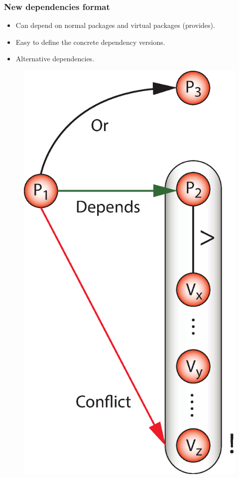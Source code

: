 \documentclass{beamer}
\begin{document}
\begin{frame}
\frametitle{New dependencies format}
\begin{itemize}
  \item Can depend on normal packages and virtual packages (provides).
  \item Easy to define the concrete dependency versions.
  \item Alternative dependencies.
\end{itemize}
\begin{figure}[h!]
  \centering
  \includegraphics[height=0.5\textheight]{q6.eps}
\end{figure}
\end{frame}
\end{document}
